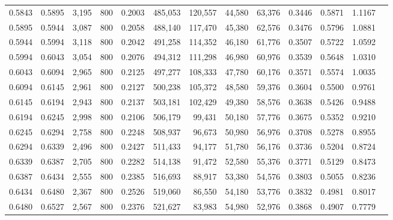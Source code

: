 \begin{tabular}{rrrrrrrrrrrrr}
0.5843 & 0.5895 &  3,195 &   800 &                                     0.2003 & 485,053 & 120,557 &  44,580 &  63,376 & 0.3446 & 0.5871 & 1.1167 \\
0.5895 & 0.5944 &  3,087 &   800 &                                     0.2058 & 488,140 & 117,470 &  45,380 &  62,576 & 0.3476 & 0.5796 & 1.0881 \\
0.5944 & 0.5994 &  3,118 &   800 &                                     0.2042 & 491,258 & 114,352 &  46,180 &  61,776 & 0.3507 & 0.5722 & 1.0592 \\
0.5994 & 0.6043 &  3,054 &   800 &                                     0.2076 & 494,312 & 111,298 &  46,980 &  60,976 & 0.3539 & 0.5648 & 1.0310 \\
0.6043 & 0.6094 &  2,965 &   800 &                                     0.2125 & 497,277 & 108,333 &  47,780 &  60,176 & 0.3571 & 0.5574 & 1.0035 \\
0.6094 & 0.6145 &  2,961 &   800 &                                     0.2127 & 500,238 & 105,372 &  48,580 &  59,376 & 0.3604 & 0.5500 & 0.9761 \\
0.6145 & 0.6194 &  2,943 &   800 &                                     0.2137 & 503,181 & 102,429 &  49,380 &  58,576 & 0.3638 & 0.5426 & 0.9488 \\
0.6194 & 0.6245 &  2,998 &   800 &                                     0.2106 & 506,179 &  99,431 &  50,180 &  57,776 & 0.3675 & 0.5352 & 0.9210 \\
0.6245 & 0.6294 &  2,758 &   800 &                                     0.2248 & 508,937 &  96,673 &  50,980 &  56,976 & 0.3708 & 0.5278 & 0.8955 \\
0.6294 & 0.6339 &  2,496 &   800 &                                     0.2427 & 511,433 &  94,177 &  51,780 &  56,176 & 0.3736 & 0.5204 & 0.8724 \\
0.6339 & 0.6387 &  2,705 &   800 &                                     0.2282 & 514,138 &  91,472 &  52,580 &  55,376 & 0.3771 & 0.5129 & 0.8473 \\
0.6387 & 0.6434 &  2,555 &   800 &                                     0.2385 & 516,693 &  88,917 &  53,380 &  54,576 & 0.3803 & 0.5055 & 0.8236 \\
0.6434 & 0.6480 &  2,367 &   800 &                                     0.2526 & 519,060 &  86,550 &  54,180 &  53,776 & 0.3832 & 0.4981 & 0.8017 \\
0.6480 & 0.6527 &  2,567 &   800 &                                     0.2376 & 521,627 &  83,983 &  54,980 &  52,976 & 0.3868 & 0.4907 & 0.7779 \\

\end{tabular}
